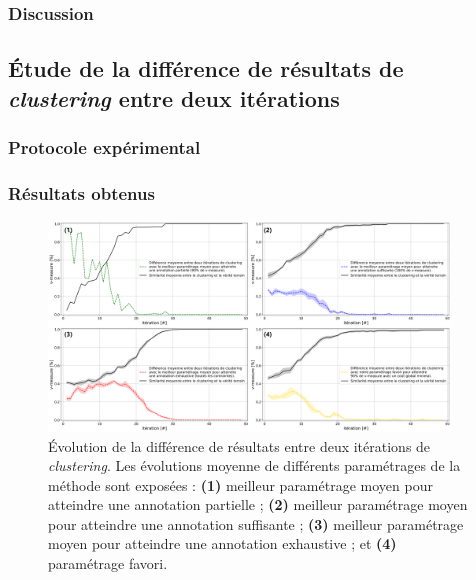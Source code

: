		\subsubsection{Discussion}
		
			
	
	
	
	\subsection{Étude de la différence de résultats de \textit{clustering} entre deux itérations}
	\label{section:4.5.2-ETUDE-RENTABILITE-SIMILARITE-CLUSTERING}
	
		\subsubsection{Protocole expérimental}
		

		\subsubsection{Résultats obtenus}
		
			
			\begin{figure}[!htb]
				\centering
				\includegraphics[width=0.95\textwidth]{figures/etude-rentabilite-similarite-clustering}
				\caption{Évolution de la différence de résultats entre deux itérations de \textit{clustering}.
				Les évolutions moyenne de différents paramétrages de la méthode sont exposées :
				\textbf{(1)} meilleur paramétrage moyen pour atteindre une annotation partielle ;
				\textbf{(2)} meilleur paramétrage moyen pour atteindre une annotation suffisante ;
				\textbf{(3)} meilleur paramétrage moyen pour atteindre une annotation exhaustive ;
				et \textbf{(4)} paramétrage favori.
				}
				\label{figure:4.5.2-ETUDE-RENTABILITE-SIMILARITE-CLUSTERING}
			\end{figure}

